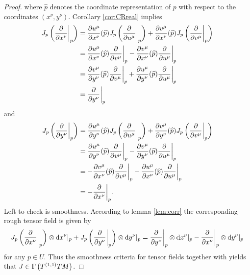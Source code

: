 \begin{proof}
\noindent where $\widehat{p}$ denotes the coordinate representation of $p$ with respect to the coordinates $(x^\nu,y^\nu)$. Corollary \ref{cor:CRreal} implies
\begin{align*}
J_p\del[3]{\frac{\partial}{\partial x^\nu}\bigg\vert_p} &= \frac{\partial u^\mu}{\partial x^\nu}(\widehat{p})J_p\del[3]{\frac{\partial}{\partial u^\mu}\bigg\vert_p} + \frac{\partial v^\mu}{\partial x^\nu}(\widehat{p})J_p\del[3]{\frac{\partial}{\partial v^\mu}\bigg\vert_p}\\
&= \frac{\partial u^\mu}{\partial x^\nu}(\widehat{p})\frac{\partial}{\partial v^\mu}\bigg\vert_p - \frac{\partial v^\mu}{\partial x^\nu}(\widehat{p})\frac{\partial}{\partial u^\mu}\bigg\vert_p\\
&= \frac{\partial v^\mu}{\partial y^\nu}(\widehat{p})\frac{\partial}{\partial v^\mu}\bigg\vert_p + \frac{\partial u^\mu}{\partial y^\nu}(\widehat{p})\frac{\partial}{\partial u^\mu}\bigg\vert_p\\
&= \frac{\partial}{\partial y^\nu}\bigg\vert_p
\end{align*}
\noindent and
\begin{align*}
J_p\del[3]{\frac{\partial}{\partial y^\nu}\bigg\vert_p} &= \frac{\partial u^\mu}{\partial y^\nu}(\widehat{p})J_p\del[3]{\frac{\partial}{\partial u^\mu}\bigg\vert_p} + \frac{\partial v^\mu}{\partial y^\nu}(\widehat{p})J_p\del[3]{\frac{\partial}{\partial v^\mu}\bigg\vert_p}\\
&= \frac{\partial u^\mu}{\partial y^\nu}(\widehat{p})\frac{\partial}{\partial v^\mu}\bigg\vert_p - \frac{\partial v^\mu}{\partial y^\nu}(\widehat{p})\frac{\partial}{\partial u^\mu}\bigg\vert_p\\
&= -\frac{\partial v^\mu}{\partial x^\nu}(\widehat{p})\frac{\partial}{\partial v^\mu}\bigg\vert_p - \frac{\partial u^\mu}{\partial x^\nu}(\widehat{p})\frac{\partial}{\partial u^\mu}\bigg\vert_p\\
&= -\frac{\partial}{\partial x^\nu}\bigg\vert_p.
\end{align*}
Left to check is smoothness. According to lemma \ref{lem:corr} the corresponding rough tensor field is given by
\begin{equation*}
J_p\del[3]{\frac{\partial}{\partial x^\nu}\bigg\vert_p} \otimes \d x^\nu\vert_p + J_p\del[3]{\frac{\partial}{\partial y^\nu}\bigg\vert_p} \otimes \d y^\nu\vert_p = \frac{\partial}{\partial y^\nu}\bigg\vert_p \otimes \d x^\nu\vert_p - \frac{\partial}{\partial x^\nu}\bigg\vert_p \otimes \d y^\nu\vert_p
\end{equation*}
\noindent for any $p \in U$. Thus the smoothness criteria for tensor fields \cite[317--318]{lee:smooth_manifolds:2013} together with \cite[36]{lee:smooth_manifolds:2013} yields that $J \in \Gamma\del[1]{T^{(1,1)}TM}$.
\end{proof}
\printbibliography

